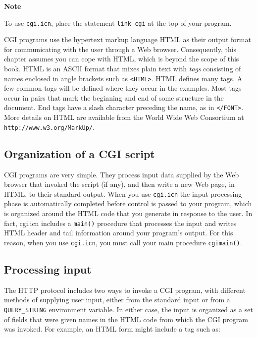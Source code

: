 {\sffamily\bfseries Note}

{\sffamily To use \texttt{cgi.icn}, place the statement \texttt{link cgi}
at the top of your program.}

CGI programs use the hypertext markup language HTML as their output
format for communicating with the user through a Web browser.
Consequently, this chapter assumes you can cope with HTML, which is
beyond the scope of this book. HTML is an ASCII format that mixes plain
text with \textit{tags} consisting of names enclosed in angle brackets
such as \texttt{{\textless}HTML{\textgreater}}. HTML defines many tags.
A few common tags will be defined where they occur in the examples.
Most tags occur in pairs that mark the beginning and end of some
structure in the document. End tags have a slash character preceding
the name, as in \texttt{{\textless}/FONT{\textgreater}}. More details
on HTML are available from the World Wide Web Consortium at
\texttt{http://www.w3.org/MarkUp/}.

\subsection*{Organization of a CGI script}

CGI programs are very simple. They process input data supplied by the
Web browser that invoked the script (if any), and then write a new Web
page, in HTML, to their standard output. When you use \texttt{cgi.icn}
the input-processing phase is automatically completed before control is
passed to your program, which is organized around the HTML code that
you generate in response to the user. In fact, cgi.icn includes a
\texttt{main()} procedure that processes the input and writes HTML
header and tail information around your program's
output. For this reason,
when you use \texttt{cgi.icn}, you must call your main procedure
\texttt{cgimain()}.

\subsection*{Processing input}

The HTTP protocol includes two ways to invoke a CGI program,
with different methods of supplying user input, either from the
standard input or from a \texttt{QUERY\_STRING} environment variable.
In either case, the input is organized as a set of fields that were
given names in the HTML code from which the CGI program was invoked.
For example, an HTML form might include a tag such as: 


